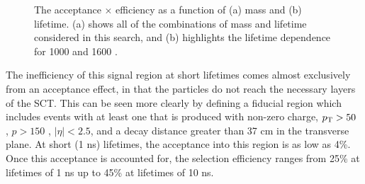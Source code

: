 \begin{figure}
\centering
{}
\caption{The acceptance $\times$ efficiency as a function of \rhadron (a) mass and (b) lifetime. (a) shows all of the combinations of mass and lifetime considered in this search, and (b) highlights the lifetime dependence for 1000 \GeV and 1600 \GeV \rhadrons.}
\label{fig:efficiency}
\end{figure}

The inefficiency of this signal region at short lifetimes comes almost exclusively from an acceptance effect, in that the particles do not reach the necessary layers of the SCT.
This can be seen more clearly by defining a fiducial region which includes events with at least one \rhadron that is produced with non-zero charge, $p_{\mathrm{T}} > 50$ \GeV, $p > 150$ \GeV, $|\eta| < 2.5$, and a decay distance greater than 37 cm in the transverse plane.
At short (1 ns) lifetimes, the acceptance into this region is as low as 4\%. 
Once this acceptance is accounted for, the selection efficiency ranges from 25\% at lifetimes of 1 ns up to 45\% at lifetimes of 10 ns. 

